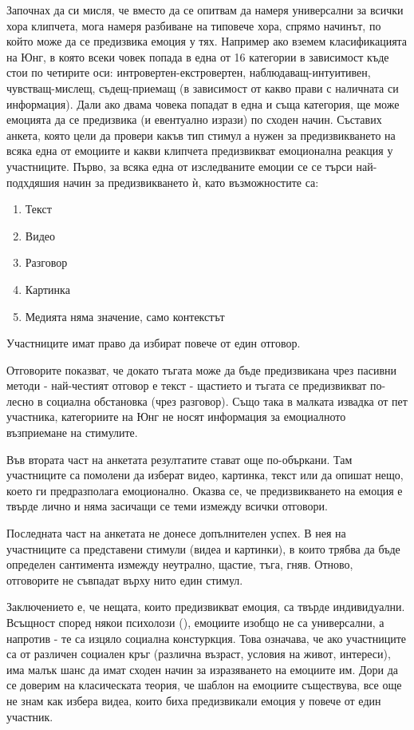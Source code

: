 \documentclass[main.tex]{subfiles}
\begin{document}
Започнах да си мисля, че вместо да се опитвам да намеря универсални за всички хора клипчета, мога намеря разбиване на типовече хора, спрямо начинът, по който може да се предизвика емоция у тях. Например ако вземем класификацията на Юнг, в която всеки човек попада в една от 16 категории в зависимост къде стои по четирите оси: интровертен-екстровертен, наблюдаващ-интуитивен,  чувстващ-мислещ, съдещ-приемащ (в зависимост от какво прави с наличната си информация). Дали ако двама човека попадат в една и съща категория, ще може емоцията да се предизвика (и евентуално изрази) по сходен начин. Съставих анкета, която цели да провери какъв тип стимул а нужен за предизвикването на всяка една от емоциите и какви клипчета предизвикват емоционална реакция у участниците. Първо, за всяка една от изследваните емоции се се търси най-подхдяшия начин за предизвикването ѝ, като възможностите са:
\begin{enumerate}
    \item Текст
    \item Видео
    \item Разговор
    \item Картинка
    \item Медията няма значение, само контекстът
\end{enumerate}
Участниците имат право да избират повече от един отговор.

Отговорите показват, че докато тъгата може да бъде предизвикана чрез пасивни методи - най-честият отговор е текст - щастието и тъгата се предизвикват по-лесно в социална обстановка (чрез разговор). Също така в малката извадка от пет участника, категориите на Юнг не носят информация за емоциалното възприемане на стимулите.

Във втората част на анкетата резултатите стават още по-объркани. Там участниците са помолени да изберат видео, картинка, текст или да опишат нещо, което ги предразполага емоционално. Оказва се, че предизвикването на емоция е твърде лично и няма засичащи се теми измежду всички отговори.

Последната част на анкетата не донесе допълнителен успех. В нея на участниците са представени стимули (видеа и картинки), в които трябва да бъде определен сантимента измежду неутрално, щастие, тъга, гняв. Отново, отговорите не съвпадат върху нито един стимул.

Заключението е, че нещата, които предизвикват емоция, са твърде индивидуални. Всъщност според някои психолози (\cite{stupid-book}), емоциите изобщо не са универсални, а напротив - те са изцяло социална констуркция. Това означава, че ако участниците са от различен социален кръг (различна възраст, условия на живот, интереси), има малък шанс да имат сходен начин за изразяването на емоциите им. Дори да се доверим на класическата теория, че шаблон на емоциите съществува, все още не знам как избера видеа, които биха предизвикали емоция у повече от един участник.
\end{document}
